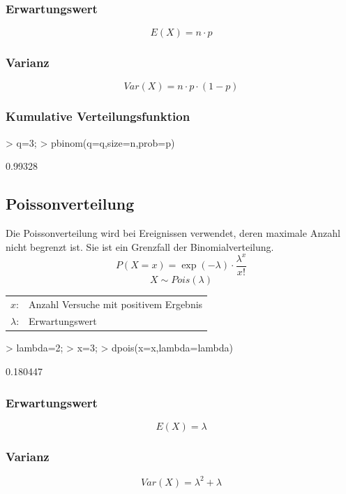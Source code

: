 \subsubsection{Erwartungswert}
\[ E(X) = n \cdot p \]

\subsubsection{Varianz}
\[ Var(X) = n \cdot p \cdot (1 - p) \]

\subsubsection{Kumulative Verteilungsfunktion}
\begin{Schunk}
\begin{Sinput}
> q=3;
> pbinom(q=q,size=n,prob=p)
\end{Sinput}
\begin{Soutput}
[1] 0.99328
\end{Soutput}
\end{Schunk}

\subsection{Poissonverteilung}
Die Poissonverteilung wird bei Ereignissen verwendet, deren maximale Anzahl 
nicht begrenzt ist. Sie ist ein Grenzfall der Binomialverteilung. 
\[ P(X=x) = \exp(-\lambda) \cdot \frac{\lambda^x}{x!} \]
\[ X \sim Pois(\lambda) \]
\begin{tabular}{@{}ll}
  $x$: & Anzahl Versuche mit positivem Ergebnis \\
  $\lambda$: & Erwartungswert
\end{tabular} 
\begin{Schunk}
\begin{Sinput}
> lambda=2;
> x=3;
> dpois(x=x,lambda=lambda)
\end{Sinput}
\begin{Soutput}
[1] 0.180447
\end{Soutput}
\end{Schunk}

\subsubsection{Erwartungswert}
\[ E(X) = \lambda \]

\subsubsection{Varianz}
\[ Var(X) = \lambda^2 + \lambda \]


